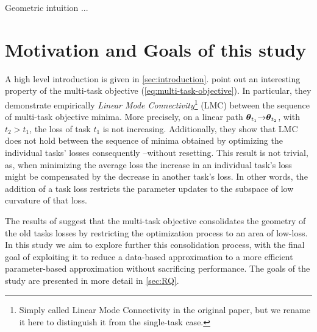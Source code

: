 \documentclass{article} %
\begin{document}
\citet{farquhar_unifying_2019}

Geometric intuition ...

\newpage
\section{Motivation and Goals of this study}

A high level introduction is given in \cref{sec:introduction}.
\citet{mirzadeh_linear_2020-1} point out an interesting property of the multi-task objective (\cref{eq:multi-task-objective}). In particular, they demonstrate empirically \emph{Linear Mode Connectivity}\footnote{Simply called Linear Mode Connectivity in the original paper, but we rename it here to distinguish it from the single-task case.} (LMC) between the sequence of multi-task objective minima. More precisely, on a linear path $\mbox{$\mbox{$\boldsymbol{\theta}$}$}_{t_1} \mbox{$\rightarrow$} \mbox{$\mbox{$\boldsymbol{\theta}$}$}_{t_2}$, with $t_2 > t_1$, the loss of task $t_1$ is not increasing. Additionally, they show that LMC does not hold between the sequence of minima obtained by optimizing the individual tasks' losses consequently --without resetting. This result is not trivial, as, when minimizing the average loss the increase in an individual task's loss might be compensated by the decrease in another task's loss.  In other words, the addition of a task loss restricts the parameter updates to the subspace of low curvature of that loss. 


The results of \citet{mirzadeh_linear_2020-1} suggest that the multi-task objective consolidates the geometry of the old tasks losses by restricting the optimization process to an area of low-loss. In this study we aim to explore further this consolidation process, with the final goal of exploiting it to reduce a data-based approximation to a more efficient parameter-based approximation without sacrificing performance. The goals of the study are presented in more detail in \cref{sec:RQ}. 
\end{document}
